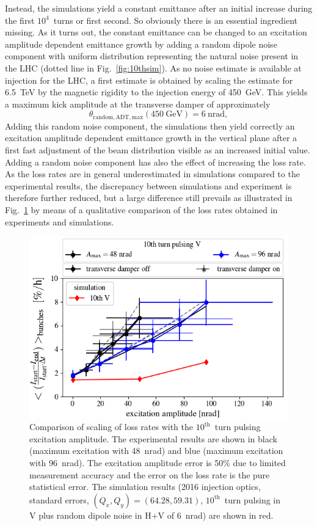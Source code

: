\documentclass[%
 reprint,
 amsmath,amssymb,
 aps,
prstab,
]{revtex4-1}
\begin{document}
Instead, the simulations yield a constant emittance after an initial increase during the first $10^4$~turns or first second. So obviously there is an essential ingredient missing. As it turns out, the constant emittance can be changed to an excitation amplitude dependent emittance growth by adding a random dipole noise component with uniform distribution representing the natural noise present in the LHC (dotted line in Fig.~\ref{fig:10thsim}). As no noise estimate is available at injection for the LHC, a first estimate is obtained by scaling the estimate for 6.5~TeV \cite{md1433_noise_top_energy,md_noise_bbLHC} by the magnetic rigidity to the injection energy of 450~GeV. This yields a maximum kick amplitude at the transverse damper of approximately
\begin{equation}
\theta_{\mathrm{random,ADT,max}}(\mathrm{450~GeV}) = 6~\mathrm{nrad},
\end{equation}
Adding this random noise component, the simulations then yield correctly an excitation amplitude dependent emittance growth in the vertical plane after a first fast adjustment of the beam distribution visible as an increased initial value. Adding a random noise component has also the effect of increasing the loss rate. As the loss rates are in general underestimated in simulations compared to the experimental results, the discrepancy between simulations and experiment is therefore further reduced, but a large difference still prevails as illustrated in Fig.~\ref{fig:10thexpsim} by means of a qualitative comparison of the loss rates obtained in experiments and simulations.
\begin{figure}[h]
		\centering
		\includegraphics[width=1.0\linewidth]{scale_amp_10v_ran_lbllong_sim.png}
	\caption{\label{fig:10thexpsim} Comparison of scaling of loss rates with the $10^{\mathrm{th}}$~turn pulsing excitation amplitude. The experimental results are shown in black (maximum excitation with 48~nrad) and blue (maximum excitation with 96~nrad). The excitation amplitude error is 50\% due to limited measurement accuracy and the error on the loss rate is the pure statistical error. The simulation results (2016 injection optics, standard errors, $(Q_x,Q_y)=(64.28,59.31)$, $10^{\mathrm{th}}$~turn pulsing in V plus random dipole noise in H+V of 6~nrad) are shown in red.}
\end{figure}
\end{document}
